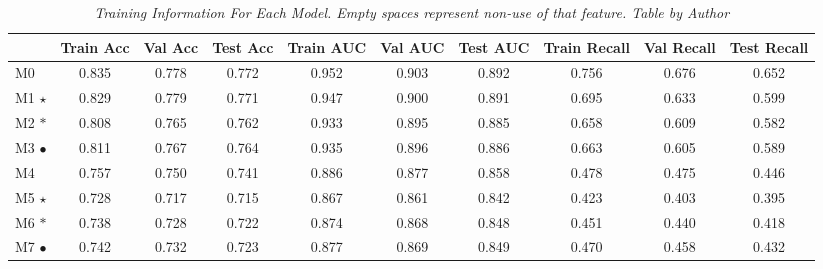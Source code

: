 \begin{landscape}

\begin{table}
\centering
\begin{tabular}{lccccccccc}
    \toprule
 & Train Acc & Val Acc & Test Acc & Train AUC & Val AUC &  Test AUC & Train Recall & Val Recall &  Test Recall \\
 \midrule
M0 & 0.835 & 0.778 & 0.772 & 0.952 & 0.903 & 0.892 & 0.756 & 0.676 & 0.652 \\
M1 $\star$ & 0.829 & 0.779 & 0.771 & 0.947 & 0.900 & 0.891 & 0.695 & 0.633 & 0.599 \\
M2 $\ast$ & 0.808 & 0.765 & 0.762 & 0.933 & 0.895 & 0.885 & 0.658 & 0.609 & 0.582 \\
M3 $\bullet$ & 0.811 & 0.767 & 0.764 & 0.935 & 0.896 & 0.886 & 0.663 & 0.605 & 0.589 \\
\cellcolor{gray!50}M4 & \cellcolor{gray!50}0.757 & \cellcolor{gray!50}0.750 & \cellcolor{gray!50}0.741 &  \cellcolor{gray!50}0.886 & \cellcolor{gray!50}0.877 & \cellcolor{gray!50}0.858 & \cellcolor{gray!50}0.478 & \cellcolor{gray!50}0.475 & \cellcolor{gray!50}0.446 \\
\cellcolor{gray!50}M5 $\star$ & \cellcolor{gray!50}0.728 & \cellcolor{gray!50}0.717 &  \cellcolor{gray!50}0.715 & \cellcolor{gray!50}0.867 & \cellcolor{gray!50}0.861 & \cellcolor{gray!50}0.842 & \cellcolor{gray!50}0.423 & \cellcolor{gray!50}0.403 & \cellcolor{gray!50}0.395 \\
\cellcolor{gray!50}M6 $\ast$ & \cellcolor{gray!50}0.738 & \cellcolor{gray!50}0.728 &  \cellcolor{gray!50}0.722 & \cellcolor{gray!50}0.874 & \cellcolor{gray!50}0.868 & \cellcolor{gray!50}0.848 & \cellcolor{gray!50}0.451 & \cellcolor{gray!50}0.440 & \cellcolor{gray!50}0.418 \\
\cellcolor{gray!50}M7 $\bullet$ & \cellcolor{gray!50}0.742 & \cellcolor{gray!50}0.732 &  \cellcolor{gray!50}0.723 & \cellcolor{gray!50}0.877 & \cellcolor{gray!50}0.869 & \cellcolor{gray!50}0.849 & \cellcolor{gray!50}0.470 & \cellcolor{gray!50}0.458 & \cellcolor{gray!50}0.432 \\
\bottomrule
\end{tabular}
\caption[Training Information For Each Model.]
  {\textit{Training Information For Each Model. Empty spaces represent non-use of that feature.
  Table by Author}}
{\label{table:resume-metrics}}
\end{table}

\end{landscape}
